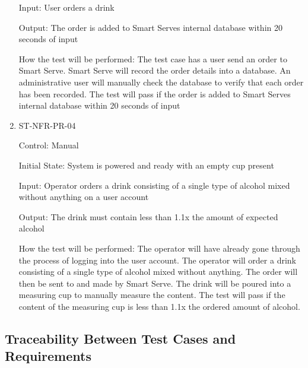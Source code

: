 \documentclass[12pt, titlepage]{article}
\begin{document}
\begin{enumerate}
Input: User orders a drink

Output: The order is added to Smart Serves internal database within 20 seconds of input

How the test will be performed: The test case has a user send an order to Smart Serve. Smart Serve will record the order details into a database. An administrative user will manually check the database to verify that each order has been recorded. The  test will pass if the order is added to Smart Serves internal database within 20 seconds of input

\item{ST-NFR-PR-04\\}

Control: Manual

Initial State: System is powered and ready with an empty cup present

Input: Operator orders a drink consisting of a single type of alcohol mixed without anything on a user account

Output: The drink must contain less than 1.1x the amount of expected alcohol

How the test will be performed: The operator will have already gone through the process of logging into the user account. The operator will order a drink consisting of a single type of alcohol mixed without anything. The order will then be sent to and made by Smart Serve. The drink will be poured into a measuring cup to manually measure the content. The test will pass if the content of the measuring cup is less than 1.1x the ordered amount of alcohol.


\end{enumerate}

\subsection{Traceability Between Test Cases and Requirements}

\end{document}
